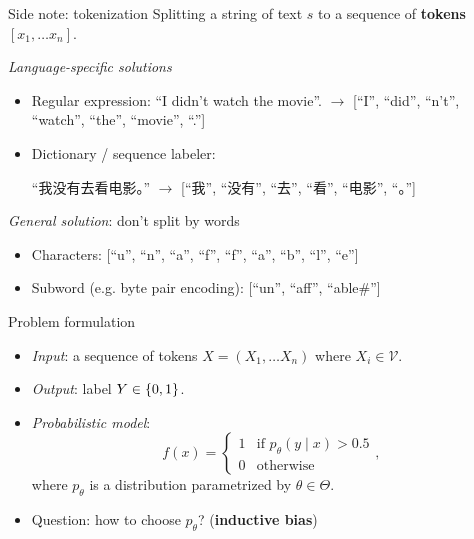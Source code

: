 \documentclass[usenames,dvipsnames,notes]{beamer}
\begin{document}
\begin{frame}
    {Side note: tokenization}
    Splitting a string of text $s$ to a sequence of \textbf{tokens} $[x_1, \ldots x_n]$.

    \emph{Language-specific solutions}\\
    \begin{itemize}
        \itemsep1em
        \item Regular expression: ``I didn't watch the movie''. $\rightarrow$ [``I'', ``did'', ``n't'', ``watch'', ``the'', ``movie'', ``.''] 
        \item Dictionary / sequence labeler: 
            \begin{CJK*}{UTF8}{gbsn}
                ``我没有去看电影。'' $\rightarrow$ [``我'', ``没有'', ``去'', ``看'', ``电影'', ``。'']
            \end{CJK*}
    \end{itemize}

    \pause
    \emph{General solution}: don't split by words\\
    \begin{itemize}
        \item Characters:
            [``u'', ``n'', ``a'', ``f'', ``f'', ``a'', ``b'', ``l'', ``e'']
        \item Subword (e.g. byte pair encoding):
            [``un'', ``aff'', ``able\#'']
    \end{itemize}
\end{frame}

\begin{frame}
    {Problem formulation}
    \begin{itemize}
        \itemsep1em
        \item \emph{Input}: a sequence of tokens $X=(X_1, \ldots X_n)$ where $X_i \in \mathcal{V}$.
        \item \emph{Output}: label $Y\in \left\{ 0, 1 \right\}$.
        \item \emph{Probabilistic model}:
            $$
            f(x) = \begin{cases}
 1 & \text{if $p_\theta(y\mid x) > 0.5$} \\
 0 & \text{otherwise}
 \end{cases} ,
            $$
            where $p_\theta$ is a distribution parametrized by $\theta\in{\Theta}$.
        \item Question: how to choose $p_\theta$? (\textbf{inductive bias})
    \end{itemize}
\end{frame}
\end{document}
